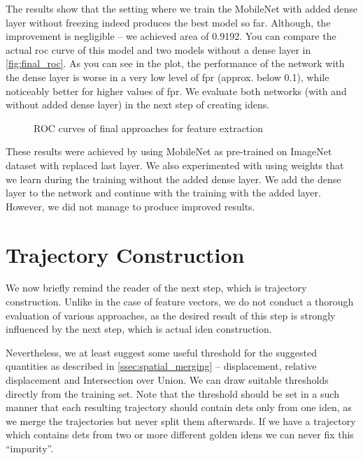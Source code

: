 The results show that the setting where we train the MobileNet with added dense layer without freezing indeed produces the best model so far. Although, the improvement is negligible -- we achieved area of 0.9192. You can compare the actual \gls{roc} curve of this model and two models without a dense layer in \autoref{fig:final_roc}. As you can see in the plot, the performance of the network with the dense layer is worse in a very low level of \gls{fpr} (approx. below 0.1), while noticeably better for higher values of \gls{fpr}. We evaluate both networks (with and without added dense layer) in the next step of creating \glspl{iden}.


\begin{figure}
    \centering
    \def\svgwidth{\columnwidth}
    
    \caption{ROC curves of final approaches for feature extraction}
    \label{fig:final_roc}
\end{figure}

These results were achieved by using MobileNet as pre-trained on ImageNet dataset with replaced last layer. We also experimented with using weights that we learn during the training without the added dense layer. We add the dense layer to the network and continue with the training with the added layer. However, we did not manage to produce improved results. 


\section{Trajectory Construction}

We now briefly remind the reader of the next step, which is trajectory construction. Unlike in the case of feature vectors, we do not conduct a thorough evaluation of various approaches, as the desired result of this step is strongly influenced by the next step, which is actual \gls{iden} construction.

Nevertheless, we at least suggest some useful threshold for the suggested quantities as described in \autoref{ssec:spatial_merging} -- displacement, relative displacement and Intersection over Union. We can draw suitable thresholds directly from the training set. Note that the threshold should be set in a such manner that each resulting trajectory should contain \glspl{det} only from one \gls{iden}, as we merge the trajectories but never split them afterwards. If we have a trajectory which contains \glspl{det} from two or more different golden \glspl{iden} we can never fix this ``impurity''.

